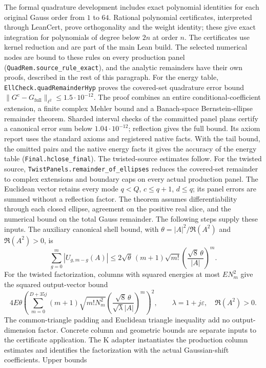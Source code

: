 \documentclass[11pt,a4paper]{article}
\newcommand{\lean}[1]{\texttt{\small #1}}
\begin{document}
The formal quadrature development includes exact polynomial identities for
each original Gauss order from $1$ to $64$.  Rational polynomial certificates,
interpreted through LeanCert, prove orthogonality and the weight identity;
these give exact integration for polynomials of degree below $2n$ at order $n$.
The certificates use kernel reduction and are part of the main Lean build.
The selected numerical nodes are bound to these rules on every production
panel (\lean{QuadRem.source\_rule\_exact}), and the analytic remainders have their
own proofs, described in the rest of this paragraph.
For the energy table, \texttt{EllCheck.quadRemainderHyp} proves the covered-set
quadrature error bound $\|G^{\mathrm c}-G_{\mathrm{full}}\|_{\ell^2}\le1.5\cdot10^{-12}$.
The proof combines an entire conditional-coefficient extension, a finite complex
Mehler bound and a Banach-space Bernstein-ellipse remainder theorem. Sharded
interval checks of the committed panel plans certify a canonical error sum below
$1.04\cdot10^{-12}$; reflection gives the full bound. Its axiom report uses the
standard axioms and registered native facts. With the tail bound, the omitted
pairs and the native energy facts it gives the accuracy of the energy table
(\lean{Final.hclose\_final}). The twisted-source estimates follow.
For the twisted source, \texttt{TwistPanels.remainder\_of\_ellipses} reduces the
covered-set remainder to complex extensions and boundary caps on every actual
production panel. The Euclidean vector retains every mode
$q<Q$, $c\le q+1$, $d\le q$; its panel errors are summed without a reflection
factor. The theorem assumes differentiability through each closed ellipse,
agreement on the positive real slice, and the numerical bound on the total
Gauss remainder. The following steps supply these inputs.
The auxiliary canonical shell bound, with $\theta=|A|^2/\Re(A^2)$ and
$\Re(A^2)>0$, is
\[
 \sum_{g=0}^{m}|U_{g,m-g}(A)|
 \le 2\sqrt{\theta}\,(m+1)\sqrt{m!}
       \left(\frac{\sqrt{8}\,\theta}{|A|}\right)^m.
\]
For the twisted factorization, columns with squared energies at most
$E N_m^2$ give the squared output-vector bound
\[
 4E\theta\left(\sum_{m=0}^{D+35j}(m+1)\sqrt{m!N_m^2}
       \left(\frac{\sqrt8\,\theta}{\sqrt{\lambda}|A|}\right)^m\right)^2,
 \qquad \lambda=1+j\varepsilon,\quad \Re(A^2)>0.
\]
The common-triangle padding and Euclidean triangle inequality add no
output-dimension factor. Concrete column and geometric bounds are separate
inputs to the certificate application.
The K adapter instantiates the production column estimates and identifies
the factorization with the actual Gaussian-shift coefficients. Upper bounds
\end{document}

